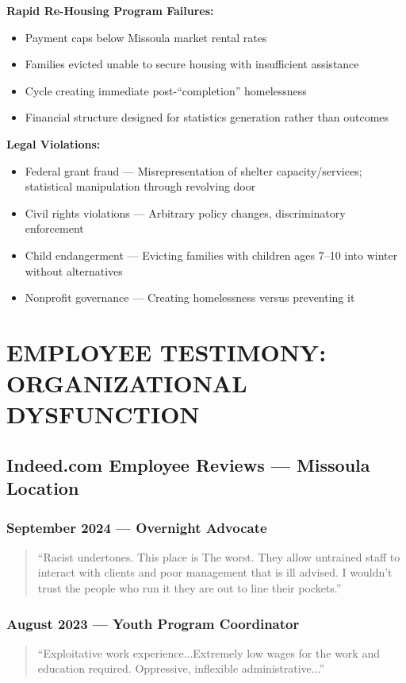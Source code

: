 \documentclass[11pt,letterpaper]{article}
\begin{document}
\textbf{Rapid Re-Housing Program Failures:}
\begin{itemize}[leftmargin=*]
\item Payment caps below Missoula market rental rates
\item Families evicted unable to secure housing with insufficient assistance
\item Cycle creating immediate post-``completion'' homelessness
\item Financial structure designed for statistics generation rather than outcomes
\end{itemize}

\textbf{Legal Violations:}
\begin{itemize}[leftmargin=*]
\item Federal grant fraud --- Misrepresentation of shelter capacity/services; statistical manipulation through revolving door
\item Civil rights violations --- Arbitrary policy changes, discriminatory enforcement
\item Child endangerment --- Evicting families with children ages 7--10 into winter without alternatives
\item Nonprofit governance --- Creating homelessness versus preventing it
\end{itemize}

\newpage

\section{EMPLOYEE TESTIMONY: ORGANIZATIONAL DYSFUNCTION}

\subsection{Indeed.com Employee Reviews --- Missoula Location}

\subsubsection{September 2024 --- Overnight Advocate}
\begin{quote}
``Racist undertones. This place is The worst. They allow untrained staff to interact with clients and poor management that is ill advised. I wouldn't trust the people who run it they are out to line their pockets.''
\end{quote}

\subsubsection{August 2023 --- Youth Program Coordinator}
\begin{quote}
``Exploitative work experience...Extremely low wages for the work and education required. Oppressive, inflexible administrative...''
\end{quote}
\end{document}
